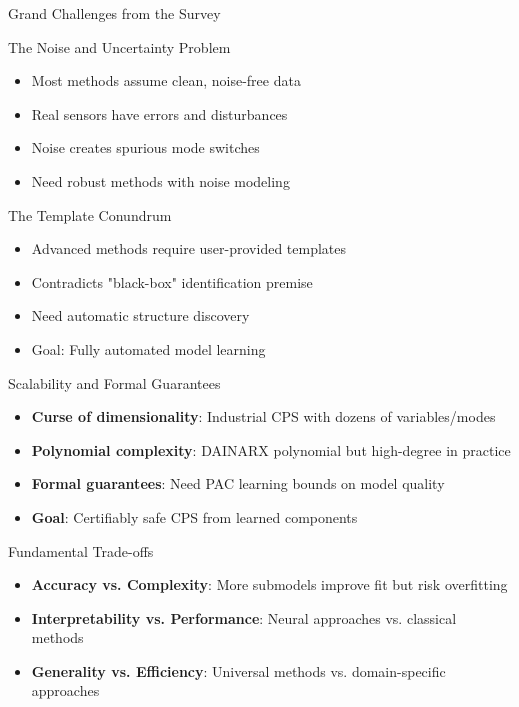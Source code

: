 \documentclass[aspectratio=169]{beamer}
\begin{document}
\begin{frame}{Grand Challenges from the Survey}
\begin{block}{The Noise and Uncertainty Problem}
\begin{itemize}
\item Most methods assume clean, noise-free data
\item Real sensors have errors and disturbances
\item Noise creates spurious mode switches
\item Need robust methods with noise modeling
\end{itemize}
\end{block}

\begin{block}{The Template Conundrum}
\begin{itemize}
\item Advanced methods require user-provided templates
\item Contradicts "black-box" identification premise
\item Need automatic structure discovery
\item Goal: Fully automated model learning
\end{itemize}
\end{block}

\begin{block}{Scalability and Formal Guarantees}
\begin{itemize}
\item \textbf{Curse of dimensionality}: Industrial CPS with dozens of variables/modes
\item \textbf{Polynomial complexity}: DAINARX polynomial but high-degree in practice
\item \textbf{Formal guarantees}: Need PAC learning bounds on model quality
\item \textbf{Goal}: Certifiably safe CPS from learned components
\end{itemize}
\end{block}

\begin{alertblock}{Fundamental Trade-offs}
\begin{itemize}
\item \textbf{Accuracy vs. Complexity}: More submodels improve fit but risk overfitting
\item \textbf{Interpretability vs. Performance}: Neural approaches vs. classical methods
\item \textbf{Generality vs. Efficiency}: Universal methods vs. domain-specific approaches
\end{itemize}
\end{alertblock}
\end{frame}
\end{document}
